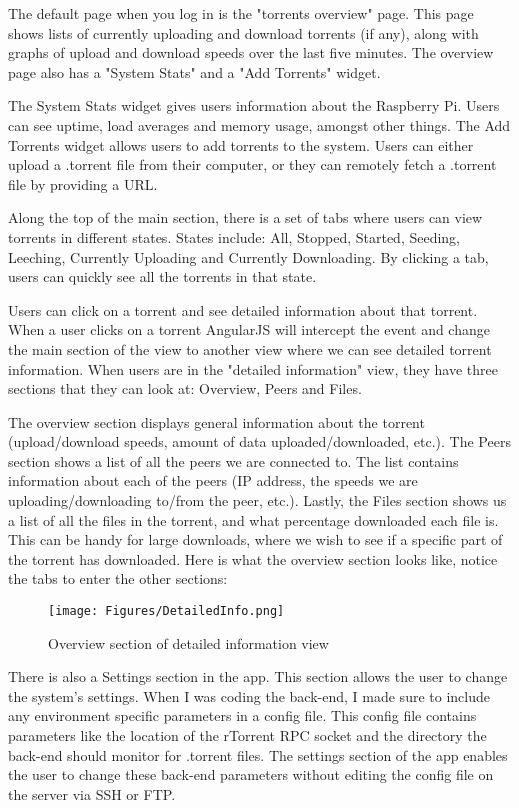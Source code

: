 The default page when you log in is the "torrents overview" page. This page shows lists of currently uploading and download torrents (if any), along with graphs of upload and download speeds over the last five minutes. The overview page also has a "System Stats" and a "Add Torrents" widget.

The System Stats widget gives users information about the Raspberry Pi. Users can see uptime, load averages and memory usage, amongst other things. The Add Torrents widget allows users to add torrents to the system. Users can either upload a .torrent file from their computer, or they can remotely fetch a .torrent file by providing a URL. 

Along the top of the main section, there is a set of tabs where users can view torrents in different states. States include: All, Stopped, Started, Seeding, Leeching, Currently Uploading and Currently Downloading. By clicking a tab, users can quickly see all the torrents in that state.

Users can click on a torrent and see detailed information about that torrent. When a user clicks on a torrent AngularJS will intercept the event and change the main section of the view to another view where we can see detailed torrent information. When users are in the "detailed information" view, they have three sections that they can look at: Overview, Peers and Files. 

The overview section displays general information about the torrent (upload/download speeds, amount of data uploaded/downloaded, etc.). The Peers section shows a list of all the peers we are connected to. The list contains information about each of the peers (IP address, the speeds we are uploading/downloading to/from the peer, etc.). Lastly, the Files section shows us a list of all the files in the torrent, and what percentage downloaded each file is. This can be handy for large downloads, where we wish to see if a specific part of the torrent has downloaded. Here is what the overview section looks like, notice the tabs to enter the other sections:

\vspace{10px}
\begin{figure}[h!]
  \centering
    \texttt{[image: Figures/DetailedInfo.png]}
  \caption{Overview section of detailed information view}
\end{figure}

There is also a Settings section in the app. This section allows the user to change the system's settings. When I was coding the back-end, I made sure to include any environment specific parameters in a config file. This config file contains parameters like the location of the rTorrent RPC socket and the directory the back-end should monitor for .torrent files. The settings section of the app enables the user to change these back-end parameters without editing the config file on the server via SSH or FTP.

